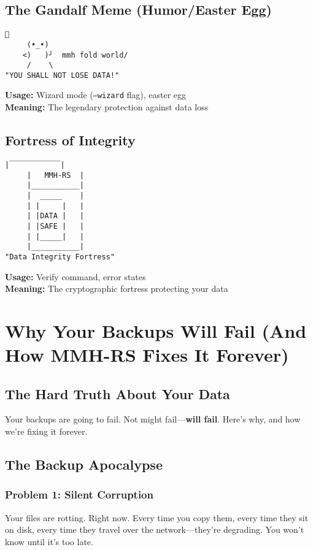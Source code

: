 \documentclass[11pt,a4paper]{article}
\begin{document}
	\subsection{The Gandalf Meme (Humor/Easter Egg)}
	\begin{lstlisting}[basicstyle=\ttfamily\small]
      🧙
     (•_•)
    <)   )╯  mmh fold world/
     /    \
"YOU SHALL NOT LOSE DATA!"
	\end{lstlisting}
	\textbf{Usage:} Wizard mode (\texttt{--wizard} flag), easter egg \\
	\textbf{Meaning:} The legendary protection against data loss

	\subsection{Fortress of Integrity}
	\begin{lstlisting}[basicstyle=\ttfamily\small]
     |￣￣￣￣￣￣￣|
     |   MMH-RS  |
     |___________|
     |  _____    |
     | |     |   |
     | |DATA |   |
     | |SAFE |   |
     | |_____|   |
     |___________|
"Data Integrity Fortress"
	\end{lstlisting}
	\textbf{Usage:} Verify command, error states \\
	\textbf{Meaning:} The cryptographic fortress protecting your data

	\section{Why Your Backups Will Fail (And How MMH-RS Fixes It Forever)}
	\label{sec:backupfailures}

	\subsection{The Hard Truth About Your Data}

	Your backups are going to fail. Not might fail—\textbf{will fail}. Here's why, and how we're fixing it forever.

	\subsection{The Backup Apocalypse}

	\subsubsection{Problem 1: Silent Corruption}
	Your files are rotting. Right now. Every time you copy them, every time they sit on disk, every time they travel over the network—they're degrading. You won't know until it's too late.
\end{document}
